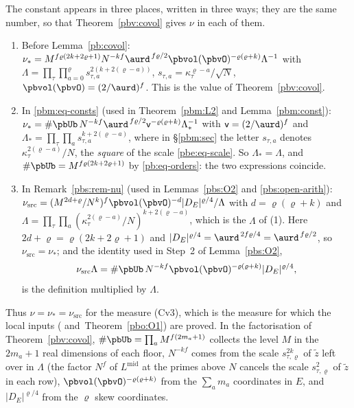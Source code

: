 \documentclass[10pt]{amsart}
\theoremstyle{definition}
\theoremstyle{remark}
\begin{document}
The constant appears in three places, written in three ways; they are the same number, so that
Theorem~\ref{pbv:covol} gives $\nu$ in each of them.
\begin{enumerate}
\item[(1)] Before Lemma~\ref{pb:covol}: $\nu_*=M^{f\varrho(2k+2\varrho+1)}N^{-kf}\aurd^{\,f\varrho/2}\pbvol(\pbvO)^{-\varrho
(\varrho+k)}\Lambda^{-1}$ with $\Lambda=\prod_\tau\prod_{a=0}^\varrho s_{\tau,a}^{2(k+2(\varrho-a))}$, $s_{\tau,a}=
\kappa_\tau^{\varrho-a}/\sqrt N$, $\pbvol(\pbvO)=(2/\aurd)^f$. This is the value of Theorem~\ref{pbv:covol}.
\item[(2)] In \eqref{pbm:eq-consts} (used in Theorem~\ref{pbm:L2} and Lemma~\ref{pbm:const}):
$\nu_*=\#\pbUb\,N^{-kf}\aurd^{\,f\varrho/2}\mathsf v^{-\varrho(\varrho+k)}\Lambda_*^{-1}$ with $\mathsf v=(2/\aurd)^f$ and
$\Lambda_*=\prod_\tau\prod_as_{\tau,a}^{k+2(\varrho-a)}$, where in \S\ref{pbm:sec} the letter $s_{\tau,a}$ denotes
$\kappa_\tau^{2(\varrho-a)}/N$, the \emph{square} of the scale \eqref{pbe:eq-scale}. So $\Lambda_*=\Lambda$, and
$\#\pbUb=M^{f\varrho(2k+2\varrho+1)}$ by \eqref{pb:eq-orders}: the two expressions coincide.
\item[(3)] In Remark~\ref{pbs:rem-nu} (used in Lemmas~\ref{pbs:O2} and \ref{pbs:open-arith}):
$\nu_{\mathrm{src}}=(M^{2d+\varrho}/N^k)^f\pbvol(\pbvO)^{-d}|D_E|^{\varrho/4}/\Lambda$ with $d=\varrho(\varrho+k)$ and
$\Lambda=\prod_\tau\prod_a(\kappa_\tau^{2(\varrho-a)}/N)^{k+2(\varrho-a)}$, which is the $\Lambda$ of (1). Here
$2d+\varrho=\varrho(2k+2\varrho+1)$ and $|D_E|^{\varrho/4}=\aurd^{\,2f\varrho/4}=\aurd^{\,f\varrho/2}$, so $\nu_{\mathrm{src}}=\nu_*$; and
the identity used in Step~2 of Lemma~\ref{pbs:O2},
\[
\nu_{\mathrm{src}}\Lambda=\#\pbUb\,N^{-kf}\pbvol(\pbvO)^{-\varrho(\varrho+k)}|D_E|^{\varrho/4},
\]
is the definition multiplied by $\Lambda$.
\end{enumerate}
Thus $\nu=\nu_*=\nu_{\mathrm{src}}$ for the measure (Cv3), which is the measure for which the local inputs
({\cite[Theorem~2.17]{P52}} and~Theorem~\ref{pbo:O1}) are proved. In the factorisation of Theorem~\ref{pbv:covol},
$\#\pbUb=\prod_aM^{f(2m_a+1)}$ collects the level $M$ in the $2m_a+1$ real dimensions of each floor, $N^{-kf}$ comes from the scale
$s_{\tau,\varrho}^{2k}$ of $\tilde z$ left over in $\Lambda$ (the factor $N^f$ of $L^{\mathrm{mid}}$ at the
primes above $N$ cancels the scale $s_{\tau,\varrho}^2$ of $\tilde z$ in each row), $\pbvol(\pbvO)^{-\varrho(\varrho+k)}$
from the $\sum_am_a$ coordinates in $E$, and $|D_E|^{\varrho/4}$ from the $\varrho$ skew coordinates.
\end{document}
